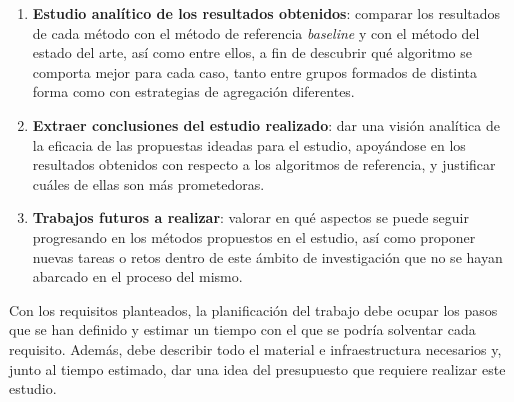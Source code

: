 \begin{enumerate}
	\item{\textbf{Estudio analítico de los resultados obtenidos}: comparar los resultados de cada método con el método de referencia \textit{baseline} y con el método del estado del arte, así como entre ellos, a fin de descubrir qué algoritmo se comporta mejor para cada caso, tanto entre grupos formados de distinta forma como con estrategias de agregación diferentes.}
	\item{\textbf{Extraer conclusiones del estudio realizado}: dar una visión analítica de la eficacia de las propuestas ideadas para el estudio, apoyándose en los resultados obtenidos con respecto a los algoritmos de referencia, y justificar cuáles de ellas son más prometedoras.}
	\item{\textbf{Trabajos futuros a realizar}: valorar en qué aspectos se puede seguir progresando en los métodos propuestos en el estudio, así como proponer nuevas tareas o retos dentro de este ámbito de investigación que no se hayan abarcado en el proceso del mismo.}
\end{enumerate}

Con los requisitos planteados, la planificación del trabajo debe ocupar los pasos que se han definido y estimar un tiempo con el que se podría solventar cada requisito. Además, debe describir todo el material e infraestructura necesarios y, junto al tiempo estimado, dar una idea del presupuesto que requiere realizar este estudio.

